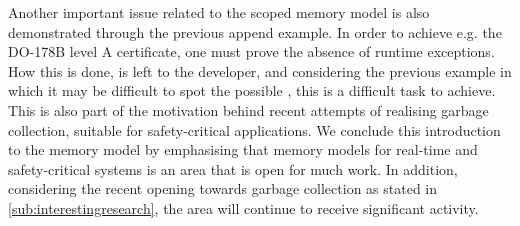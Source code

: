 Another important issue related to the scoped memory model is also demonstrated through the previous  append example. In order to achieve e.g. the DO-178B level A certificate, one must prove the absence of runtime exceptions\cite{Schoeberl:2007:GCS:1288940.1288953}. How this is done, is left to the developer, and considering the previous example in which it may be difficult to spot the possible , this is a difficult task to achieve. This is also part of the motivation behind recent attempts of realising garbage collection, suitable for safety-critical applications. We conclude this introduction to the memory model by emphasising that memory models for real-time and safety-critical systems is an area that is open for much work. In addition, considering the recent opening towards garbage collection as stated in \ref{sub:interestingresearch}, the area will continue to receive significant activity.